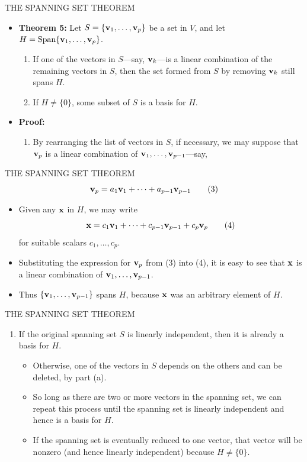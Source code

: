 \begin{frame}[shrink=15]{THE SPANNING SET THEOREM}
\begin{itemize}
\item \textbf{Theorem 5:} Let $S=\{\mathbf{v}_1,\ldots,\mathbf{v}_p\}$ be a set in $V$, and let $H=\operatorname{Span}\{\mathbf{v}_1,\ldots,\mathbf{v}_p\}$.
\begin{enumerate}
\item[(a.)] If one of the vectors in $S$---say, $\mathbf{v}_k$---is a linear combination of the remaining vectors in $S$, then the set formed from $S$ by removing $\mathbf{v}_k$ still spans $H$.
\item[(b.)] If $H\ne\{0\}$, some subset of $S$ is a basis for $H$.
\end{enumerate}
\item \textbf{Proof:}
\begin{enumerate}
\item[(a.)] By rearranging the list of vectors in $S$, if necessary, we may suppose that $\mathbf{v}_p$ is a linear combination of $\mathbf{v}_1,\ldots,\mathbf{v}_{p-1}$---say,
\end{enumerate}
\end{itemize}
\end{frame}

\begin{frame}[shrink=16]{THE SPANNING SET THEOREM}
\[
\mathbf{v}_p=a_1\mathbf{v}_1+\cdots+a_{p-1}\mathbf{v}_{p-1} \tag{3}
\]
\begin{itemize}
\item Given any $\mathbf{x}$ in $H$, we may write
\[
\mathbf{x}=c_1\mathbf{v}_1+\cdots+c_{p-1}\mathbf{v}_{p-1}+c_p\mathbf{v}_p \tag{4}
\]
for suitable scalars $c_1,\ldots,c_p$.
\item Substituting the expression for $\mathbf{v}_p$ from (3) into (4), it is easy to see that $\mathbf{x}$ is a linear combination of $\mathbf{v}_1,\ldots,\mathbf{v}_{p-1}$.
\item Thus $\{\mathbf{v}_1,\ldots,\mathbf{v}_{p-1}\}$ spans $H$, because $\mathbf{x}$ was an arbitrary element of $H$.
\end{itemize}
\end{frame}

\begin{frame}[shrink=13]{THE SPANNING SET THEOREM}
\begin{enumerate}
\item[(b.)] If the original spanning set $S$ is linearly independent, then it is already a basis for $H$.
\begin{itemize}
\item Otherwise, one of the vectors in $S$ depends on the others and can be deleted, by part (a).
\item So long as there are two or more vectors in the spanning set, we can repeat this process until the spanning set is linearly independent and hence is a basis for $H$.
\item If the spanning set is eventually reduced to one vector, that vector will be nonzero (and hence linearly independent) because $H\ne\{0\}$.
\end{itemize}
\end{enumerate}
\end{frame}


